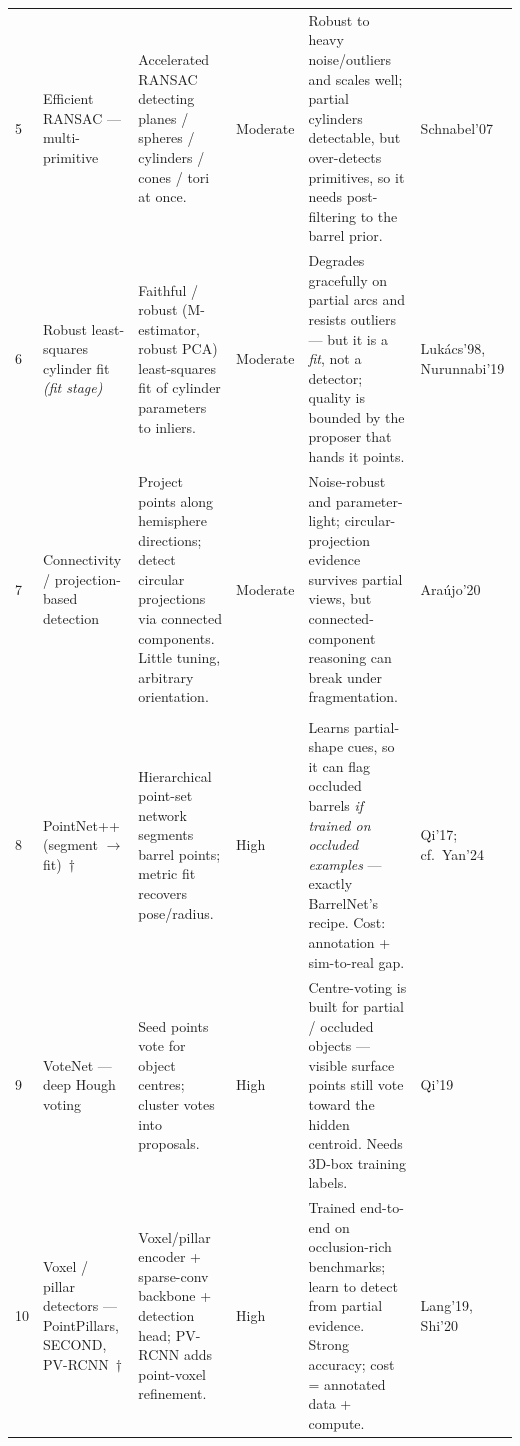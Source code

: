 \documentclass[10pt,a4paper]{article}
\newcommand{\stars}[1]{%
  \ifcase#1\or
  \ding{72}\ding{73}\ding{73}\ding{73}\ding{73}\or
  \ding{72}\ding{72}\ding{73}\ding{73}\ding{73}\or
  \ding{72}\ding{72}\ding{72}\ding{73}\ding{73}\or
  \ding{72}\ding{72}\ding{72}\ding{72}\ding{73}\or
  \ding{72}\ding{72}\ding{72}\ding{72}\ding{72}\fi}
\begin{document}
\begin{landscape}
\begin{longtable}{@{}R{0.5cm} R{3.3cm} R{6.7cm} R{2.2cm} R{7.0cm} R{2.5cm}@{}}
5 & Efficient RANSAC --- multi-primitive &
Accelerated RANSAC detecting planes / spheres / cylinders / cones / tori at once. &
\stars{3}\newline Moderate &
Robust to heavy noise/outliers and scales well; partial cylinders detectable, but over-detects primitives, so it needs post-filtering to the barrel prior. &
Schnabel'07\\

6 & Robust least-squares cylinder fit \emph{(fit stage)} &
Faithful / robust (M-estimator, robust PCA) least-squares fit of cylinder parameters to inliers. &
\stars{3}\newline Moderate &
Degrades gracefully on partial arcs and resists outliers --- but it is a \emph{fit}, not a detector; quality is bounded by the proposer that hands it points. &
Luk\'acs'98, Nurunnabi'19\\

7 & Connectivity / projection-based detection &
Project points along hemisphere directions; detect circular projections via connected components. Little tuning, arbitrary orientation. &
\stars{3}\newline Moderate &
Noise-robust and parameter-light; circular-projection evidence survives partial views, but connected-component reasoning can break under fragmentation. &
Ara\'ujo'20\\

\\
8 & PointNet++ (segment $\to$ fit)~$\dagger$ &
Hierarchical point-set network segments barrel points; metric fit recovers pose/radius. &
\stars{4}\newline High &
Learns partial-shape cues, so it can flag occluded barrels \emph{if trained on occluded examples} --- exactly BarrelNet's recipe. Cost: annotation + sim-to-real gap. &
Qi'17; cf.\ Yan'24\\

9 & VoteNet --- deep Hough voting &
Seed points vote for object centres; cluster votes into proposals. &
\stars{4}\newline High &
Centre-voting is built for partial / occluded objects --- visible surface points still vote toward the hidden centroid. Needs 3D-box training labels. &
Qi'19\\

10 & Voxel / pillar detectors --- PointPillars, SECOND, PV-RCNN~$\dagger$ &
Voxel/pillar encoder + sparse-conv backbone + detection head; PV-RCNN adds point-voxel refinement. &
\stars{4}\newline High &
Trained end-to-end on occlusion-rich benchmarks; learn to detect from partial evidence. Strong accuracy; cost = annotated data + compute. &
Lang'19, Shi'20\\


\end{longtable}
\end{landscape}
\end{document}
